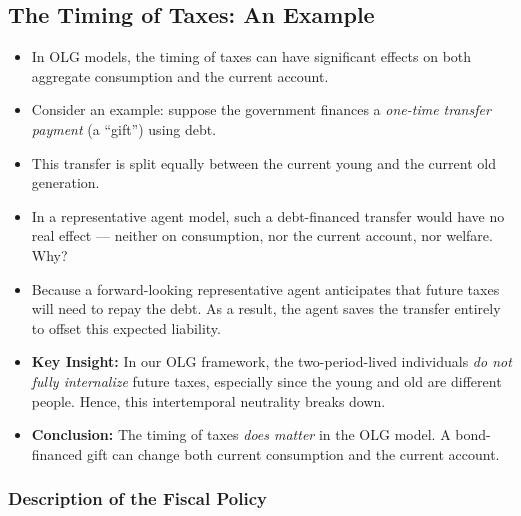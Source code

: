 \documentclass[12pt]{article}
\begin{document}
\subsection*{\noindent\textbf{The Timing of Taxes: An Example}}

\begin{itemize}
  \item In OLG models, the timing of taxes can have significant effects on both aggregate consumption and the current account.
  
  \item Consider an example: suppose the government finances a \textit{one-time transfer payment} (a “gift”) using debt.
  
  \item This transfer is split equally between the current young and the current old generation.
  
  \item In a representative agent model, such a debt-financed transfer would have no real effect — neither on consumption, nor the current account, nor welfare. Why?
  
  \item Because a forward-looking representative agent anticipates that future taxes will need to repay the debt. As a result, the agent saves the transfer entirely to offset this expected liability.
  
  \item \textbf{Key Insight:} In our OLG framework, the two-period-lived individuals \textit{do not fully internalize} future taxes, especially since the young and old are different people. Hence, this intertemporal neutrality breaks down.
  
  \item \textbf{Conclusion:} The timing of taxes \textit{does matter} in the OLG model. A bond-financed gift can change both current consumption and the current account.
\end{itemize}

\subsubsection*{\noindent\textbf{Description of the Fiscal Policy}}
\end{document}
